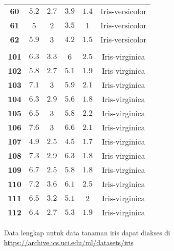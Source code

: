 \begin{longtable}[c]{cccccc}
\textbf{60} & $\num{5,2}$ & $\num{2,7}$ & $\num{3,9}$ & $\num{1,4}$ & Iris-versicolor \\
\textbf{61} & 5     & 2     & $\num{3,5}$ & 1     & Iris-versicolor \\
\textbf{62} & $\num{5,9}$ & 3     & $\num{4,2}$ & $\num{1,5}$ & Iris-versicolor \\
\\
\textbf{101} & $\num{6,3}$ & $\num{3,3}$ & 6     & $\num{2,5}$ & Iris-virginica \\
\textbf{102} & $\num{5,8}$ & $\num{2,7}$ & $\num{5,1}$ & $\num{1,9}$ & Iris-virginica \\
\textbf{103} & $\num{7,1}$ & 3     & $\num{5,9}$ & $\num{2,1}$ & Iris-virginica \\
\textbf{104} & $\num{6,3}$ & $\num{2,9}$ & $\num{5,6}$ & $\num{1,8}$ & Iris-virginica \\
\textbf{105} & $\num{6,5}$ & 3     & $\num{5,8}$ & $\num{2,2}$ & Iris-virginica \\
\textbf{106} & $\num{7,6}$ & 3     & $\num{6,6}$ & $\num{2,1}$ & Iris-virginica \\
\textbf{107} & $\num{4,9}$ & $\num{2,5}$ & $\num{4,5}$ & $\num{1,7}$ & Iris-virginica \\
\textbf{108} & $\num{7,3}$ & $\num{2,9}$ & $\num{6,3}$ & $\num{1,8}$ & Iris-virginica \\
\textbf{109} & $\num{6,7}$ & $\num{2,5}$ & $\num{5,8}$ & $\num{1,8}$ & Iris-virginica \\
\textbf{110} & $\num{7,2}$ & $\num{3,6}$ & $\num{6,1}$ & $\num{2,5}$ & Iris-virginica \\
\textbf{111} & $\num{6,5}$ & $\num{3,2}$ & $\num{5,1}$ & 2     & Iris-virginica \\
\textbf{112} & $\num{6,4}$ & $\num{2,7}$ & $\num{5,3}$ & $\num{1,9}$ & Iris-virginica \\
\end{longtable}
Data lengkap untuk data tanaman iris dapat diakses di \url{https://archive.ics.uci.edu/ml/datasets/iris}

\newpage
{} \label{lam: data mobil}


